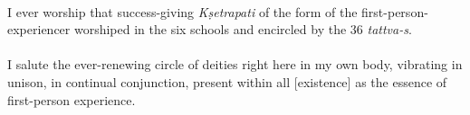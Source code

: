 \documentclass[12pt]{article}
\begin{document}
{}\\
I ever worship that success-giving \textit{Kṣetrapati} of the form of the first-person-experiencer worshiped in the six schools and encircled by the 36 \textit{tattva-s}.\\

{}\\
I salute the ever-renewing circle of deities right here in my own body, vibrating in unison, in continual conjunction, present within all [existence] as the essence of first-person experience.
\end{document}
